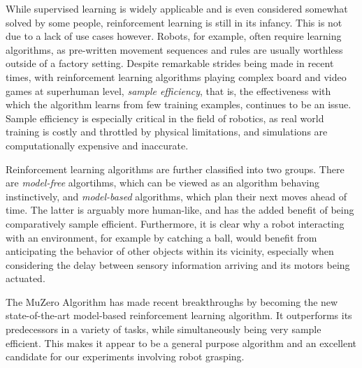 While supervised learning is widely applicable and is even considered somewhat solved by some people, reinforcement learning is still in its infancy. This is not due to a lack of use cases however. Robots, for example, often require learning algorithms, as pre-written movement sequences and rules are usually worthless outside of a factory setting. Despite remarkable strides being made in recent times, with reinforcement learning algorithms playing complex board and video games at superhuman level, \textit{sample efficiency}, that is, the effectiveness with which the algorithm learns from few training examples, continues to be an issue. Sample efficiency is especially critical in the field of robotics, as real world training is costly and throttled by physical limitations, and simulations are computationally expensive and inaccurate.

Reinforcement learning algorithms are further classified into two groups. There are \textit{model-free} algortihms, which can be viewed as an algorithm behaving instinctively, and \textit{model-based} algorithms, which plan their next moves ahead of time. The latter is arguably more human-like, and has the added benefit of being comparatively sample efficient. Furthermore, it is clear why a robot interacting with an environment, for example by catching a ball, would benefit from anticipating the behavior of other objects within its vicinity, especially when considering the delay between sensory information arriving and its motors being actuated.

The MuZero Algorithm \cite{muzero} has made recent breakthroughs by becoming the new state-of-the-art model-based reinforcement learning algorithm. It outperforms its predecessors in a variety of tasks, while simultaneously being very sample efficient. This makes it appear to be a general purpose algorithm and an excellent candidate for our experiments involving robot grasping.